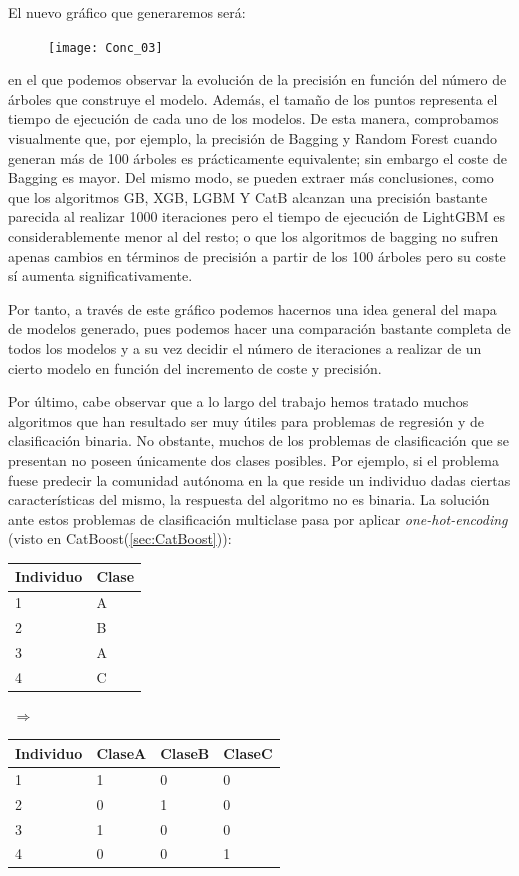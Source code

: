 \documentclass[12pt,twoside]{article}
\begin{document}
El nuevo gráfico que generaremos será:
\begin{figure}[h]
\centering
\texttt{[image: Conc\_03]}
\end{figure}

\noindent
en el que podemos observar la evolución de la precisión en función del número de árboles que construye el modelo. Además, el tamaño de los puntos representa el tiempo de ejecución de cada uno de los modelos. De esta manera, comprobamos visualmente que, por ejemplo, la precisión de Bagging y Random Forest cuando generan más de 100 árboles es prácticamente equivalente; sin embargo el coste de Bagging es mayor. Del mismo modo, se pueden extraer más conclusiones, como que los algoritmos GB, XGB, LGBM Y CatB alcanzan una precisión bastante parecida al realizar 1000 iteraciones pero el tiempo de ejecución de LightGBM es considerablemente menor al del resto; o que los algoritmos de bagging no sufren apenas cambios en términos de precisión a partir de los 100 árboles pero su coste sí aumenta significativamente.

Por tanto, a través de este gráfico podemos hacernos una idea general del mapa de modelos generado, pues podemos hacer una comparación bastante completa de todos los modelos y a su vez decidir el número de iteraciones a realizar de un cierto modelo en función del incremento de coste y precisión.

Por último, cabe observar que a lo largo del trabajo hemos tratado muchos algoritmos que han resultado ser muy útiles para problemas de regresión y de clasificación binaria. No obstante, muchos de los problemas de clasificación que se presentan no poseen únicamente dos clases posibles. Por ejemplo, si el problema fuese predecir la comunidad autónoma en la que reside un individuo dadas ciertas características del mismo, la respuesta del algoritmo no es binaria. La solución ante estos problemas de clasificación multiclase pasa por aplicar \textit{one-hot-encoding} (visto en CatBoost(\ref{sec:CatBoost})):
\begin{center}
\begin{tabular}{|l|l|}
\hline
Individuo & Clase \\ \hline
1         & A     \\ \hline
2         & B     \\ \hline
3         & A     \\ \hline
4         & C     \\ \hline
\end{tabular}
$\, \, \Rightarrow \, \,$
\begin{tabular}{|l|l|l|l|}
\hline
Individuo & ClaseA & ClaseB & ClaseC \\ \hline
1         & 1 & 0 & 0     \\ \hline
2         & 0 & 1 & 0     \\ \hline
3         & 1 & 0 & 0     \\ \hline
4         & 0 & 0 & 1     \\ \hline
\end{tabular}
\end{center}
\end{document}
